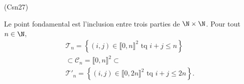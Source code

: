 \begin{tiny}(Csn27)\end{tiny} Le point fondamental est l'inclusion entre trois parties de $\N\times \N$. Pour tout $n \in \N$,
\begin{multline*}
 \mathcal{T}_n = \left\lbrace (i,j)\in \llbracket 0, n \rrbracket^2 \text{ tq } i+j \leq n\right\rbrace \\
 \subset \mathcal{C}_n = \llbracket 0,n \rrbracket^2 \subset \\
 \mathcal{T}'_n = \left\lbrace (i,j)\in \llbracket 0, 2n \rrbracket^2 \text{ tq } i+j \leq 2n\right\rbrace.
\end{multline*}
